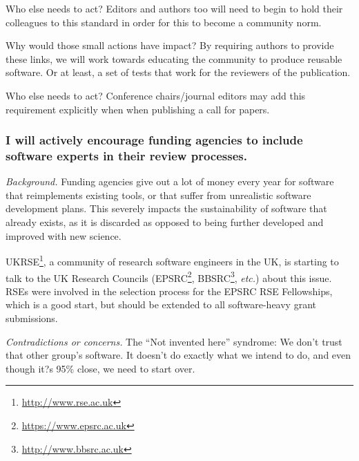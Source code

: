 \documentclass[a4paper,UKenglish]{dagman}
\renewcommand{\paragraph}[1]{\subsubsection*{#1}\xspace}
\newcommand{\etc}{\emph{etc.}\xspace}
\begin{document}
Who else needs to act? Editors and authors too will need to begin to hold their colleagues to this standard in order for this to become a community norm.

Why would those small actions have impact? By requiring authors to provide these links, we will work towards educating the community to produce reusable software. Or at least, a set of tests that work for the reviewers of the publication. 

Who else needs to act? Conference chairs/journal editors may add this requirement explicitly when when publishing a call for papers. 


\paragraph{I will actively encourage funding agencies to include software experts in their review processes.}


\emph{Background.}
Funding agencies give out a lot of money every year for software that reimplements existing tools, or that suffer from unrealistic software development plans. This severely impacts the sustainability of software that already exists, as it is discarded as opposed to being further developed and improved with new science.


UKRSE\footnote{\url{http://www.rse.ac.uk}}, a community of research software engineers in the UK, is starting to talk to the UK Research Councils (EPSRC\footnote{\url{https://www.epsrc.ac.uk}}, BBSRC\footnote{\url{http://www.bbsrc.ac.uk}}, \etc) about this issue. RSEs were involved in the selection process for the EPSRC RSE Fellowships, which is a good start, but should be extended to all software-heavy grant submissions.

\emph{Contradictions or concerns.}
The ``Not invented here'' syndrome: We don't trust that other group's software.
It doesn't do exactly what we intend to do, and even though it?s 95\% close, we need to start over.
\end{document}
